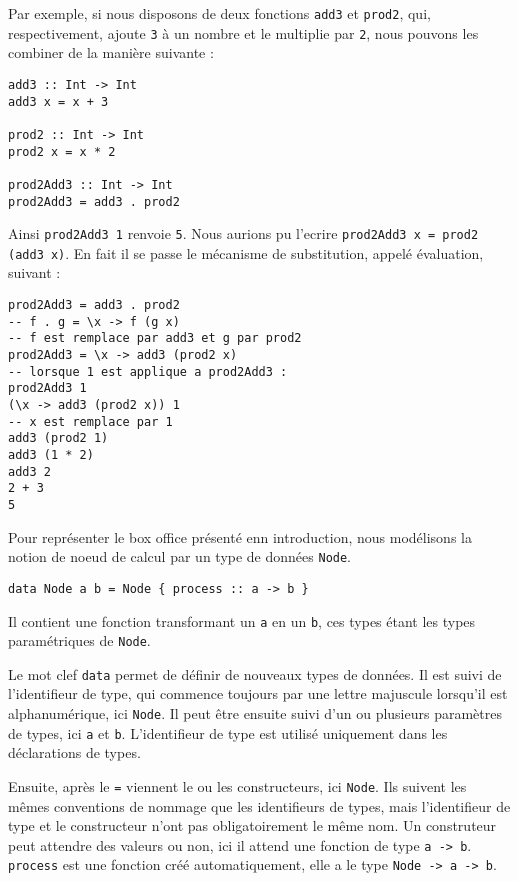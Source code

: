 \documentclass{llncs}
\begin{document}
Par exemple, si nous disposons de deux fonctions \lstinline{add3} et \lstinline{prod2},
qui, respectivement, ajoute \lstinline{3} à un nombre et le multiplie par \lstinline{2},
nous pouvons les combiner de la manière suivante :
\begin{lstlisting}
add3 :: Int -> Int
add3 x = x + 3

prod2 :: Int -> Int
prod2 x = x * 2

prod2Add3 :: Int -> Int
prod2Add3 = add3 . prod2
\end{lstlisting}

Ainsi \lstinline{prod2Add3 1} renvoie \lstinline{5}.
Nous aurions pu l'ecrire \lstinline{prod2Add3 x = prod2 (add3 x)}.
En fait il se passe le mécanisme de substitution, appelé évaluation, suivant :
\begin{lstlisting}
prod2Add3 = add3 . prod2
-- f . g = \x -> f (g x)
-- f est remplace par add3 et g par prod2
prod2Add3 = \x -> add3 (prod2 x)
-- lorsque 1 est applique a prod2Add3 :
prod2Add3 1
(\x -> add3 (prod2 x)) 1
-- x est remplace par 1
add3 (prod2 1)
add3 (1 * 2)
add3 2
2 + 3
5
\end{lstlisting}

Pour représenter le box office présenté enn introduction, nous modélisons la notion de noeud de calcul
par un type de données \lstinline{Node}.
\begin{lstlisting}
data Node a b = Node { process :: a -> b }
\end{lstlisting}

Il contient une fonction transformant un \lstinline{a} en un \lstinline{b}, ces
types étant les types paramétriques de \lstinline{Node}.

Le mot clef \lstinline{data} permet de définir de nouveaux types de données.
Il est suivi de l'identifieur de type, qui commence toujours par une lettre
majuscule lorsqu'il est alphanumérique, ici \lstinline{Node}.
Il peut être ensuite suivi d'un ou plusieurs paramètres de types, ici
\lstinline{a} et \lstinline{b}.
L'identifieur de type est utilisé uniquement dans les déclarations de types.

Ensuite, après le \lstinline{=} viennent le ou les constructeurs, ici \lstinline{Node}.
Ils suivent les mêmes conventions de nommage que les identifieurs de types, mais
l'identifieur de type et le constructeur n'ont pas obligatoirement le même nom.
Un construteur peut attendre des valeurs ou non, ici il attend une fonction de
type \lstinline{a -> b}.
\lstinline{process} est une fonction créé automatiquement, elle a le type
\lstinline{Node -> a -> b}.
\end{document}
